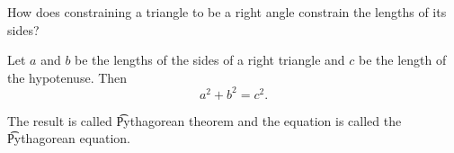 
How does constraining a triangle to be a right angle constrain the lengths of its sides?

\begin{proposition}
Let $a$ and $b$ be the lengths of the sides of a right triangle and $c$ be the length of the hypotenuse. Then
  \[
a^2 + b^2 = c^2.
  \]
\end{proposition}
The result is called \t{Pythagorean theorem} and the equation is called the \t{Pythagorean equation}.

\blankpage
